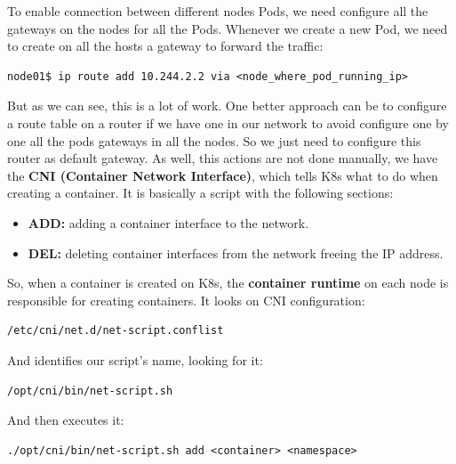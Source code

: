 \documentclass{article}
\newenvironment{codetemplate}[1][]{%
  \mybasecolorbox[#1]
  \itshape
}{%
  \endmybasecolorbox
}
\begin{document}
To enable connection between different nodes Pods, we need configure all the gateways on the nodes for all the Pods. Whenever we create a new Pod, we need to create on all the hosts a gateway to forward the traffic:
\begin{codetemplate}{}
\begin{verbatim}
node01$ ip route add 10.244.2.2 via <node_where_pod_running_ip>
\end{verbatim}
\end{codetemplate}

But as we can see, this is a lot of work. One better approach can be to configure a route table on a router if we have one in our network to avoid configure one by one all the pods gateways in all the nodes. So we just need to configure this router as default gateway.
As well, this actions are not done manually, we have the \textbf{CNI (Container Network Interface)}, which tells K8s what to do when creating a container. It is basically a script with the following sections:
\begin{itemize}
    \item \textbf{ADD:} adding a container interface to the network.
    \item \textbf{DEL:} deleting container interfaces from the network freeing the IP address.
\end{itemize}

So, when a container is created on K8s, the \textbf{container runtime} on each node is responsible for creating containers. It looks on CNI configuration:
\begin{codetemplate}{}
\begin{verbatim}
/etc/cni/net.d/net-script.conflist
\end{verbatim}
\end{codetemplate} 

And identifies our script's name, looking for it:
\begin{codetemplate}{}
\begin{verbatim}
/opt/cni/bin/net-script.sh
\end{verbatim}
\end{codetemplate} 

And then executes it:
\begin{codetemplate}{}
\begin{verbatim}
./opt/cni/bin/net-script.sh add <container> <namespace>
\end{verbatim}
\end{codetemplate} 
\end{document}
